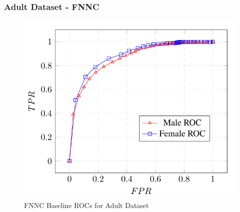 \documentclass{article}
\begin{document}


\subsubsection{Adult Dataset - FNNC}

\begin{figure}[!h]
    \centering
    \includegraphics[width=1\linewidth]{Images/FNNC_Adult_Baseline_ROC.png}
    \caption{FNNC Baseline ROCs for Adult Dataset}
    \label{fig:FNNC_Adult_ROC}
\end{figure}
\end{document}
